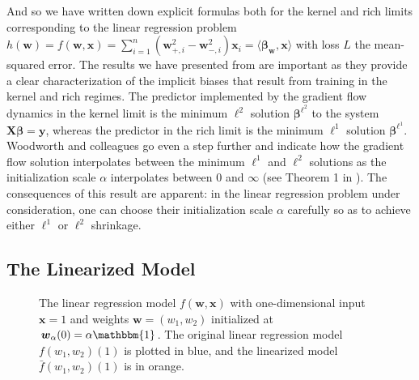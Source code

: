 \documentclass{article}
\begin{document}
And so we have written down explicit formulas both for the kernel and rich limits corresponding to the linear regression problem $h(\boldsymbol{w}) = f(\boldsymbol{w}, \boldsymbol{x}) = \sum_{i=1}^n(\boldsymbol{w}_{+, i}^2 - \boldsymbol{w}_{-, i}^2)\boldsymbol{x}_i = \langle \boldsymbol{\beta}_{\boldsymbol{w}}, \boldsymbol{x} \rangle $ with loss $L$ the mean-squared error.  The results we have presented from \cite{woodworth2020kernel} are important as they provide a clear characterization of the implicit biases that result from training in the kernel and rich regimes. The predictor implemented by the gradient flow dynamics in the kernel limit is the minimum $\ell^2$ solution $\boldsymbol{\beta}^{\ell^2}$ to the system $\boldsymbol{X} \boldsymbol{\beta} = \boldsymbol{y}$, whereas the predictor in the rich limit is the minimum $\ell^1$ solution $\boldsymbol{\beta}^{\ell^1}$. Woodworth and colleagues go even a step further and indicate how the gradient flow solution interpolates between the minimum $\ell^1$ and $\ell^2 $ solutions as the initialization scale $\alpha$ interpolates between $0$ and $\infty$ (see Theorem 1 in \cite{woodworth2020kernel}). The consequences of this result are apparent: in the linear regression problem under consideration, one can choose their initialization scale $\alpha$ carefully so as to achieve either $\ell^1$ or $\ell^2$ shrinkage.

\subsection{The Linearized Model}

\begin{figure}[H]
    \centering
    \hfill
    \caption{The linear regression model $f(\boldsymbol{w}, \boldsymbol{x})$ with one-dimensional input $\boldsymbol{x} = 1$ and weights $\boldsymbol{w} = (w_1, w_2)$ initialized at $\boldsymbol{w}_{\alpha}(0) = \alpha \mathbbm{1}$. The original linear regression model $f(w_1, w_2)(1)$ is plotted in blue, and the linearized model $\bar{f}(w_1, w_2)(1)$ is in orange.}\label{img:linearization}
\end{figure}
\end{document}

